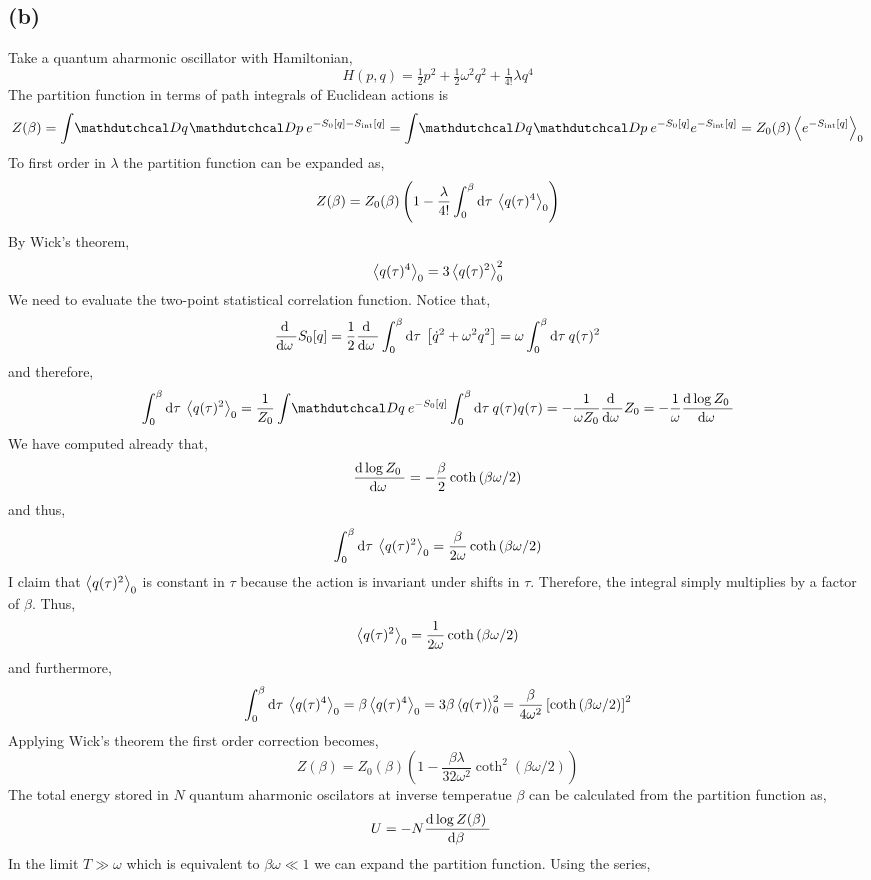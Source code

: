 \documentclass[12pt]{article}
\begin{document}
\subsection{(b)}
Take a quantum aharmonic oscillator with Hamiltonian,
\[ H(p, q) = \tfrac{1}{2} p^2 + \tfrac{1}{2} \omega^2 q^2 + \tfrac{1}{4!} \lambda q^4 \]
The partition function in terms of path integrals of Euclidean actions is
\[ Z(\beta) = \int \pathd{q} \pathd{p} e^{- S_0[q] - S_{\interact}[q]} = \int \pathd{q} \pathd{p} e^{- S_0[q]} e^{- S_{\interact}[q]} = Z_0(\beta) \EV{e^{- S_{\interact}[q]}}_0  \]
To first order in $\lambda$ the partition function can be expanded as,
\[ Z(\beta) = Z_0(\beta) \left( 1 - \frac{\lambda}{4!} \int_0^\beta \mathrm{d}\tau \: \left< q(\tau)^4 \right>_0 \right)\]
By Wick's theorem,
\[ \left< q(\tau)^4 \right>_0 = 3 \left< q(\tau)^2 \right>_0^2 \]
We need to evaluate the two-point statistical correlation function. Notice that,
\[ \frac{\mathrm{d} \:}{\mathrm{d}\omega \:} S_0[q] = \frac{1}{2} \frac{\mathrm{d} \:}{\mathrm{d}\omega \:} \int_0^\beta \mathrm{d}\tau \: \left[ \dot{q}^2 + \omega^2 q^2 \right] = \omega \int_0^\beta \mathrm{d}\tau \: q(\tau)^2 \] 
and therefore,
\begin{align*}
\int_0^\beta \d{\tau} \EV{q(\tau)^2}_0 = \frac{1}{Z_0} \int \pathd{q} e^{- S_0[q]} \int_0^\beta \d{\tau} q(\tau) q(\tau) = - \frac{1}{\omega Z_0}  \deriv{}{\omega} Z_0 = - \frac{1}{\omega} \deriv{\log{Z_0}}{\omega} 
\end{align*}
We have computed already that,
\[ \frac{\mathrm{d}\log{Z_0} \:}{\mathrm{d}\omega \:} = - \frac{\beta}{2} \coth{(\beta \omega/2)} \]
and thus,
\[ \int_0^\beta \mathrm{d}\tau \: \left< q(\tau)^2 \right>_0 = \frac{\beta}{2 \omega} \coth{(\beta \omega / 2)} \]
I claim that $\left< q(\tau)^2 \right>_0$ is constant in $\tau$ because the action is invariant under shifts in $\tau$. Therefore, the integral simply multiplies by a factor of $\beta$.
Thus,
\[ \left< q(\tau)^2 \right>_0 = \frac{1}{2 \omega} \coth{(\beta \omega / 2)} \]
and furthermore,
\[ \int_0^\beta \mathrm{d}\tau \: \left< q(\tau)^4 \right>_0 = \beta \left< q(\tau)^4 \right>_0 = 3 \beta \left< q(\tau) \right>_0^2 = \frac{\beta}{4 \omega^2} \left[ \coth{(\beta \omega / 2)} \right]^2 \]
Applying Wick's theorem the first order correction becomes,
\[ Z(\beta) = Z_0(\beta) \left( 1 - \frac{\beta \lambda}{32 \omega^2} \coth^2{(\beta \omega / 2)} \right) \]
The total energy stored in $N$ quantum aharmonic oscilators at inverse temperatue $\beta$ can be calculated from the partition function as,
\begin{align*}
U & = - N \frac{\mathrm{d}\log{Z(\beta)} \:}{\mathrm{d}\beta \:} 
\end{align*}
In the limit $T \gg \omega$ which is equivalent to $\beta \omega \ll 1$ we can expand the partition function. Using the series,
\end{document}

